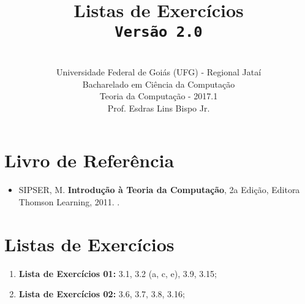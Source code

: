\documentclass[12pt,a4paper,oneside]{article}
\author{\\Universidade Federal de Goiás (UFG) - Regional Jataí\\Bacharelado em Ciência da Computação \\Teoria da Computação - 2017.1 \\Prof. Esdras Lins Bispo Jr.}
\date{}
\title{
	\sc \huge Listas de Exercícios
	\\{\tt Versão 2.0}
}
\begin{document}
\maketitle

\section{Livro de Referência}
	\begin{itemize}
		\item SIPSER, M. {\bf Introdução à Teoria da Computação}, 2a Edição, Editora Thomson Learning, 2011. \color{blue}{\bf Código Bib.: [004 SIP/int]}.
	\end{itemize}
	
\section{Listas de Exercícios}

\begin{enumerate}

	\item[] {\bf Lista de Exercícios 01:} 3.1, 3.2 (a, c, e), 3.9, 3.15;
	\item[] {\bf Lista de Exercícios 02:} 3.6, 3.7, 3.8, 3.16;
	
\end{enumerate}
\end{document}
